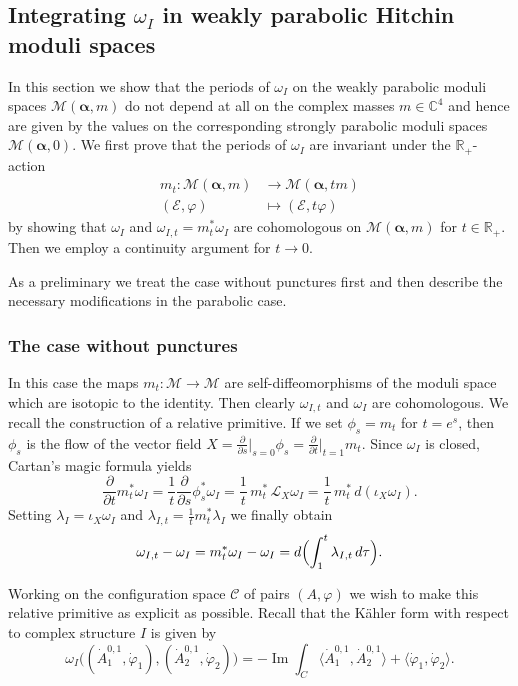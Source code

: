 \documentclass[12pt,letterpaper,reqno]{amsart}
\def\mathbf#1{#1}%
\theoremstyle{remark}
\theoremstyle{definition}
\numberwithin{thm}{section}
\numberwithin{equation}{section}
\numberwithin{figure}{section}
\newcommand{\R}{\ensuremath{\mathbb R}}
\newcommand{\C}{\ensuremath{\mathbb C}}
\newcommand{\calM}{\mathcal M}
\newcommand{\cE}{{\mathcal E}}
\newcommand{\IP}[1]{\langle#1\rangle}
\newcommand{\bsa}{\boldsymbol{\alpha}}
\newcommand{\bfm}{\mathbf{m}}
\begin{document}
\subsection{Integrating \texorpdfstring{$\omega_I$}{the real symplectic form} in weakly parabolic Hitchin moduli spaces} 

In this section we show that the periods of $\omega_I$ on the weakly parabolic moduli spaces $\calM(\bsa,\bfm)$ do not depend at all on the complex masses $\bfm \in \C^4$ and hence are given by the values on the corresponding strongly parabolic moduli spaces $\calM(\bsa,\mathbf{0})$. We first prove that the periods of $\omega_I$ are invariant under the $\R_+$-action 
\begin{align*}
m_t : \mathcal{M}(\boldsymbol \alpha,\mathbf m) &\to \mathcal{M}(\boldsymbol \alpha, t \mathbf m)\\ 
  (\cE, \varphi) &\mapsto (\cE, t \varphi) 
  \end{align*}
by showing that $\omega_I$ and $\omega_{I,t}= m_t^* \omega_I$ are cohomologous on $\calM(\bsa,\bfm)$  for $t \in \R_+$. Then we employ a continuity argument for $t \to 0$. 

As a preliminary we treat the case without punctures first and then describe the necessary modifications in the parabolic case.

\subsubsection{The case without punctures} 
In this case the maps $m_t : \mathcal M \to \mathcal M$ are self-diffeomorphisms of the moduli space which are isotopic to the identity. Then clearly $\omega_{I,t}$ and $\omega_I$ are cohomologous. We recall the construction of a relative primitive. If we set $\phi_s = m_t$ for $t=e^s$, then $\phi_s$ is the flow of the vector field $X = \frac{\partial}{\partial s}\bigr\vert_{s=0} \phi_s =   \frac{\partial}{\partial t}\bigr\vert_{t=1} m_t$. Since $\omega_I$ is closed, Cartan's magic formula yields 
\[
\frac{\partial}{\partial t}  m_t^* \omega_I =  \frac{1}{t}\frac{\partial}{\partial s} \phi_s^* \omega_I =\frac{1}{t} \, m_t^* \, \mathcal{L}_X  \omega_I =  \frac{1}{t} \, m_t^* \, d(  \iota_X  \omega_I).
 \]
Setting $\lambda_I =  \iota_X \omega_I$ and $\lambda_{I,t} = \frac{1}{t} m_t^* \lambda_I$  we finally obtain
 \[
\omega_{I,t} - \omega_I =m_t^* \omega_I - \omega_I  = d \Bigl(\int_1^t \lambda_{I,t} \, d\tau \Bigr).
\]

Working on the configuration space $\mathcal C$ of pairs $(A,\varphi)$ we wish to make this relative primitive as explicit as possible. Recall that the  K\"ahler form with respect to complex structure $I$ is given by
\[
\omega_I \bigl( (\dot A_1^{0,1}, \dot \varphi_1), (\dot A_2^{0,1}, \dot \varphi_2) \bigr) = - \operatorname{Im} \int_C \IP{\dot A_1^{0,1}, \dot A_2^{0,1}} + \IP{\dot \varphi_1, \dot \varphi_2}.
\]
\end{document}
